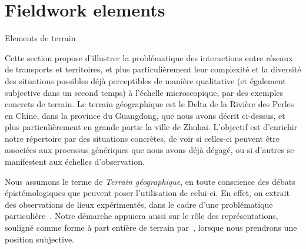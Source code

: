 


\newpage


\section{Fieldwork elements}{Elements de terrain}

\label{sec:qualitative}




Cette section propose d'illustrer la problématique des interactions entre réseaux de transports et territoires, et plus particulièrement leur complexité et la diversité des situations possibles déjà perceptibles de manière qualitative (et également subjective dans un second temps) à l'échelle microscopique, par des exemples concrets de terrain. Le terrain géographique est le Delta de la Rivière des Perles en Chine, dans la province du Guangdong, que nous avons décrit ci-dessus, et plus particulièrement en grande partie la ville de Zhuhai. L'objectif est d'enrichir notre répertoire par des situations concrètes, de voir si celles-ci peuvent être associées aux processus génériques que nous avons déjà dégagé, ou si d'autres se manifestent aux échelles d'observation.


Nous assumons le terme de \emph{Terrain géographique}, en toute conscience des débats épistémologiques que peuvent poser l'utilisation de celui-ci. En effet, on extrait des observations de lieux expérimentés, dans le cadre d'une problématique particulière~\cite{retaille2010terrain}. Notre démarche appuiera aussi sur le rôle des représentations, souligné comme forme à part entière de terrain par~\cite{lefort2012terrain}, lorsque nous prendrons une position subjective.


